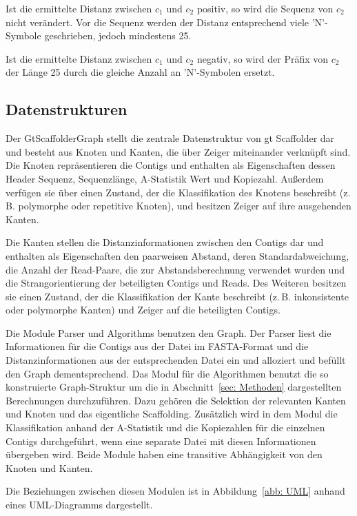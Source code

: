 \documentclass[a4paper,11pt,parskip,abstract=on]{scrartcl}
\begin{document}
Ist die ermittelte Distanz zwischen $c_1$ und $c_2$ positiv, so wird
die Sequenz von $c_2$ nicht verändert. Vor die Sequenz werden der
Distanz entsprechend viele 'N'-Symbole geschrieben, jedoch mindestens
25.

Ist die ermittelte Distanz zwischen $c_1$ und $c_2$ negativ, so wird
der Präfix von $c_2$ der Länge 25 durch die gleiche Anzahl an
'N'-Symbolen ersetzt.

\subsection{Datenstrukturen}
\label{sec: Datenstrukturen}

Der GtScaffolderGraph stellt die zentrale Datenstruktur von gt Scaffolder dar
und besteht aus Knoten und Kanten, die über Zeiger miteinander verknüpft sind.
Die Knoten repräsentieren die Contigs und enthalten als Eigenschaften dessen
Header Sequenz, Sequenzlänge, A-Statistik Wert und Kopiezahl. Außerdem
verfügen sie über einen Zustand, der die Klassifikation des Knotens beschreibt
(z.\,B. polymorphe oder repetitive Knoten), und besitzen Zeiger auf ihre ausgehenden
Kanten.

Die Kanten stellen die Distanzinformationen zwischen den Contigs dar und
enthalten als Eigenschaften den paarweisen Abstand, deren Standardabweichung,
die Anzahl der Read-Paare, die zur Abstandsberechnung verwendet wurden und die
Strangorientierung der beteiligten Contigs und Reads. Des Weiteren besitzen sie einen
Zustand, der die Klassifikation der Kante beschreibt (z.\,B. inkonsistente oder
polymorphe Kanten) und Zeiger auf die beteiligten Contigs.

Die Module Parser und Algorithms benutzen den Graph. Der Parser liest
die Informationen für die Contigs aus der Datei im FASTA-Format und
die Distanzinformationen aus der entsprechenden Datei ein und
alloziert und befüllt den Graph dementsprechend. Das Modul für die
Algorithmen benutzt die so konstruierte Graph-Struktur um die in
Abschnitt~\ref{sec: Methoden} dargestellten Berechnungen
durchzuführen. Dazu gehören die Selektion der relevanten Kanten und
Knoten und das eigentliche Scaffolding. Zusätzlich wird in dem Modul die
Klassifikation anhand der A-Statistik und die Kopiezahlen für die
einzelnen Contigs durchgeführt, wenn eine separate Datei mit diesen
Informationen übergeben wird. Beide Module haben eine transitive
Abhängigkeit von den Knoten und Kanten.

Die Beziehungen zwischen diesen Modulen ist in Abbildung~\ref{abb:
  UML} anhand eines UML-Diagramms dargestellt.
\end{document}
